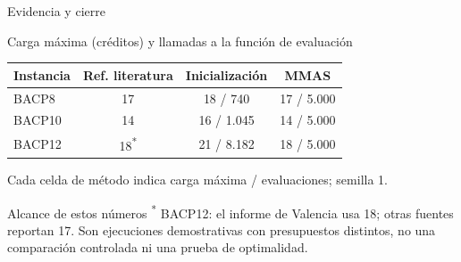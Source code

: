 \begin{frame}{Evidencia y cierre}
  \begin{block}{Carga máxima (créditos) y llamadas a la función de evaluación}
    \centering
    \small
    \begin{tabular}{lccc}
      \toprule
      Instancia & Ref. literatura & Inicialización & MMAS \\
      \midrule
      BACP8  & 17 & 18 / 740 & 17 / 5.000 \\
      BACP10 & 14 & 16 / 1.045 & 14 / 5.000 \\
      BACP12 & 18\textsuperscript{*} & 21 / 8.182 & 18 / 5.000 \\
      \bottomrule
    \end{tabular}
    \par\vspace{1mm}\scriptsize Cada celda de método indica carga máxima / evaluaciones; semilla 1.
  \end{block}
  \begin{alertblock}{Alcance de estos números}
    \scriptsize\textsuperscript{*} BACP12: el informe de Valencia usa 18;
    otras fuentes reportan 17. Son ejecuciones demostrativas con presupuestos
    distintos, no una comparación controlada ni una prueba de optimalidad.
  \end{alertblock}
\end{frame}
